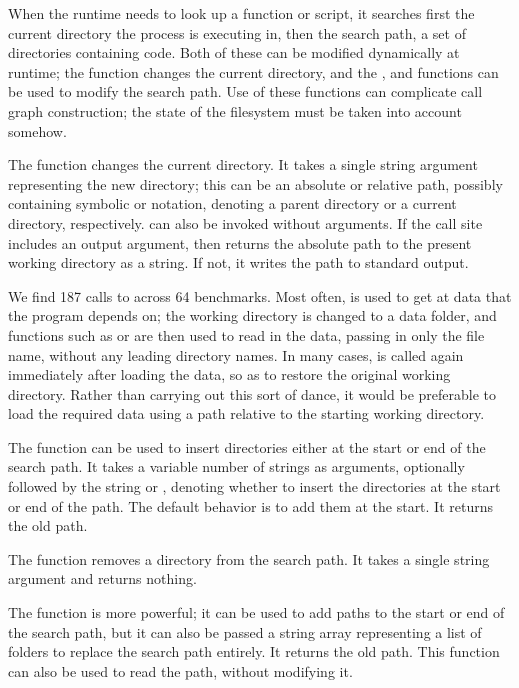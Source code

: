 When the \matlab runtime needs to look up a function or script, it searches
first the current directory the process is executing in, then the \matlab search
path, a set of directories containing \matlab code. Both of these can be
modified dynamically at runtime; the  function changes the current
directory, and the ,  and  functions can
be used to modify the search path. Use of these functions can complicate call
graph construction; the state of the filesystem must be taken into account
somehow.

The  function changes the current directory. It takes a single string
argument representing the new directory; this can be an absolute or relative
path, possibly containing symbolic  or  notation, denoting a
parent directory or a current directory, respectively.  can also be
invoked without arguments. If the call site includes an output argument, then
 returns the absolute path to the present working directory as a
string. If not, it writes the path to standard output.

We find 187 calls to  across 64 benchmarks. Most often,  is
used to get at data that the program depends on; the working directory is
changed to a data folder, and functions such as  or 
are then used to read in the data, passing in only the file name, without any
leading directory names. In many cases,  is called again immediately
after loading the data, so as to restore the original working directory. Rather
than carrying out this sort of dance, it would be preferable to load the
required data using a path relative to the starting working directory.

The  function can be used to insert directories either at the
start or end of the \matlab search path. It takes a variable number of strings
as arguments, optionally followed by the string  or
, denoting whether to insert the directories at the start or end
of the path. The default behavior is to add them at the start. It returns the
old path.

The  function removes a directory from the search path. It takes a
single string argument and returns nothing.

The  function is more powerful; it can be used to add paths to the
start or end of the search path, but it can also be passed a string array
representing a list of folders to replace the search path entirely. It returns
the old path. This function can also be used to read the path, without
modifying it.


